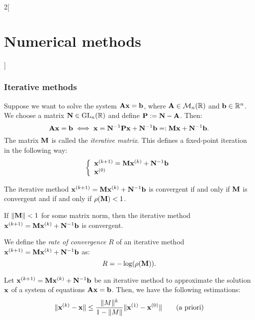 \documentclass[../../../main.tex]{subfiles}
\begin{document}
\begin{multicols}{2}[\section{Numerical methods}]
\subsubsection*{Iterative methods}
Suppose we want to solve the system $\vb{A}\vb{x}=\vb{b}$, where $\vb{A}\in\mathcal{M}_n(\mathbb{R})$ and $\vb{b}\in\mathbb{R}^n$. We choose a matrix $\vb{N}\in\mathrm{GL}_{n}(\mathbb{R})$ and define $\vb{P}:=\vb{N}-\vb{A}$. Then: $$\vb{A}\vb{x}=\vb{b}\iff \vb{x}=\vb{N}^{-1}\vb{P}\vb{x}+\vb{N}^{-1}\vb{b}=:\vb{M}\vb{x}+\vb{N}^{-1}\vb{b}.$$ The matrix $\vb{M}$ is called the \textit{iterative matrix}. This defines a fixed-point iteration in the following way:
\begin{equation*}
    \left\{
    \begin{array}{l}
        \vb{x}^{(k+1)}=\vb{M}\vb{x}^{(k)}+\vb{N}^{-1}\vb{b}\\
        \vb{x}^{(0)}
    \end{array}\right.
\end{equation*}
\begin{theorem}
    The iterative method $\vb{x}^{(k+1)}=\vb{M}\vb{x}^{(k)}+\vb{N}^{-1}\vb{b}$ is convergent if and only if $\vb{M}$ is convergent and if and only if $\rho(\vb{M})<1$.
\end{theorem}
\begin{corollary}
    If $\|\vb{M}\|<1$ for some matrix norm, then the iterative method $\vb{x}^{(k+1)}=\vb{M}\vb{x}^{(k)}+\vb{N}^{-1}\vb{b}$ is convergent.
\end{corollary}
\begin{definition}
    We define the \textit{rate of convergence $R$} of an iterative method $\vb{x}^{(k+1)}=\vb{M}\vb{x}^{(k)}+\vb{N}^{-1}\vb{b}$ as: $$R=-\log(\rho(\vb{M})).$$
\end{definition}
\begin{prop}
    Let $\vb{x}^{(k+1)}=\vb{M}\vb{x}^{(k)}+\vb{N}^{-1}\vb{b}$ be an iterative method to approximate the solution $\vb{x}$ of a system of equations $\vb{A}\vb{x}=\vb{b}$. Then, we have the following estimations:
    \begin{align*}
        \|\mathblack{x}^{(k)}-\mathblack{x}\|&\leq\frac{\|M\|^k}{1-\|M\|}\|\mathblack{x}^{(1)}-\mathblack{x}^{(0)}\|\quad&\text{(a priori)}\\

\end{align*}
\end{prop}
\end{multicols}
\end{document}
